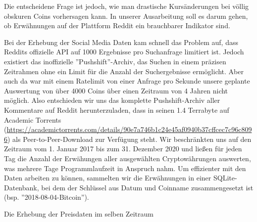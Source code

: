 \documentclass[12pt]{article}
\begin{document}
Die entscheidene Frage ist jedoch, wie man drastische Kursänderungen bei völlig obskuren Coins vorhersagen kann. In unserer Ausarbeitung soll es darum gehen, ob Erwähnungen auf der Plattform Reddit ein brauchbarer Indikator sind.

Bei der Erhebung der Social Media Daten kam schnell das Problem auf, dass Reddits offizielle API auf 1000 Ergebnisse pro Suchanfrage limitiert ist. Jedoch existiert das inoffizielle ''Pushshift''-Archiv, das Suchen in einem präzisen Zeitrahmen ohne ein Limit für die Anzahl der Suchergebnisse ermöglicht. Aber auch da war mit einem Ratelimit von einer Anfrage pro Sekunde unsere geplante Auswertung von über 4000 Coins über einen Zeitraum von 4 Jahren nicht möglich. Also entschieden wir uns das komplette Pushshift-Archiv aller Kommentare auf Reddit herunterzuladen, dass in seinen 1.4 Terrabyte auf Academic Torrents (\url{https://academictorrents.com/details/90e7a746b1c24e45af0940b37cffcec7c96c8096}) als Peer-to-Peer-Download zur Verfügung steht. Wir beschränkten uns auf den Zeitraum vom 1. Januar 2017 bis zum 31. Dezember 2020 und ließen für jeden Tag die Anzahl der Erwähungen aller ausgewählten Cryptowährungen auswerten, was mehrere Tage Programmlaufzeit in Anspruch nahm. Um effizienter mit den Daten arbeiten zu können, sammelten wir die Erwähnungen in einer SQLite-Datenbank, bei dem der Schlüssel aus Datum und Coinname zusammengesetzt ist (bsp. ''2018-08-04-Bitcoin'').

Die Erhebung der Preisdaten im selben Zeitraum
\end{document}
